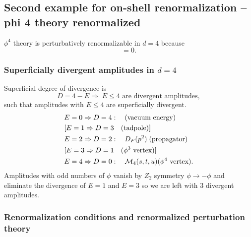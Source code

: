 \subsection{Second example for on-shell renormalization --phi 4 theory renormalized}
\label{subsec:renormalizationPhi4}
$\phi^4$ theory is perturbatively renormalizable in $d=4$ because 
\begin{equation}
[\lambda]=0.
\end{equation}
\subsubsection{Superficially divergent amplitudes in $d=4$}
Superficial degree of divergence is 
\begin{equation}
D=4-E \Rightarrow\; E\leq 4 \text{ are divergent amplitudes},
\end{equation}
such that amplitudes with $E\leq 4$ are superficially divergent.
\begin{align}
	&E=0 \Rightarrow D=4: \quad (\text{vacuum energy})\\
	&[E=1 \Rightarrow D=3 \quad (\text{tadpole})]\\
	&E=2 \Rightarrow D=2: \quad D_F(p^2) \; (\text{propagator})\\
	&[E=3 \Rightarrow D=1 \quad (\phi^3 \text{ vertex})]\\
	&E=4 \Rightarrow D=0: \quad \mathcal{M}_4(s,t,u) (\phi^4 \text{ vertex}).
\end{align}
Amplitudes with odd numbers of $\phi$ vanish by $Z_2$ symmetry $\phi \rightarrow - \phi$ and eliminate the divergence of $E=1$ and $E=3$ so we are left with $3$ divergent amplitudes.
\subsubsection{Renormalization conditions and renormalized perturbation theory}

